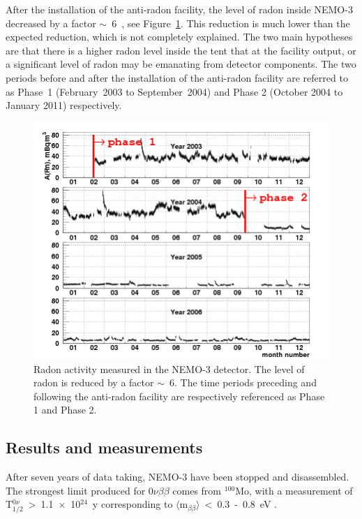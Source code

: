 \documentclass[main.tex]{subfiles}
\begin{document}
\NI After the installation of the anti-radon facility, the level of radon inside NEMO-3 decreased by a factor $\sim$~6~\cite{NEMO3-BKG}, see Figure~\ref{RadonByTime}. This reduction is much lower than the expected reduction, which is not completely explained. The two main hypotheses are that there is a higher radon level inside the tent that at the facility output, or a significant level of radon may be emanating from detector components. The two periods before and after the installation of the anti-radon facility are referred to as Phase~1 (February~2003 to September~2004) and Phase 2 (October 2004 to January 2011) respectively.

 
\begin{figure}[h!]
\begin{center}
\includegraphics[scale=0.75]{pictures/Chap3/rn_bytime.png}
\caption{Radon activity measured in the NEMO-3 detector. The level of radon is reduced by a factor $\sim$~6. The time periods preceding and following the anti-radon facility are respectively referenced as Phase 1 and Phase 2.}
\label{RadonByTime}
\end{center}
\end{figure}


\FloatBarrier


\FloatBarrier

\subsection{Results and measurements}


\NI After seven years of data taking, NEMO-3 have been stopped and disassembled. The strongest limit produced for 0$\nu\beta\beta$ comes from $^{\text{100}}$Mo, with a measurement of T$_{\text{1/2}}^{\text{0}\nu}$~>~1.1~$\times$~10$^{\text{24}}$~y corresponding to $\langle$m$_{\beta\beta}\rangle$~<~0.3~-~0.8~eV \cite{NEMO3:Mo100}.
\end{document}
